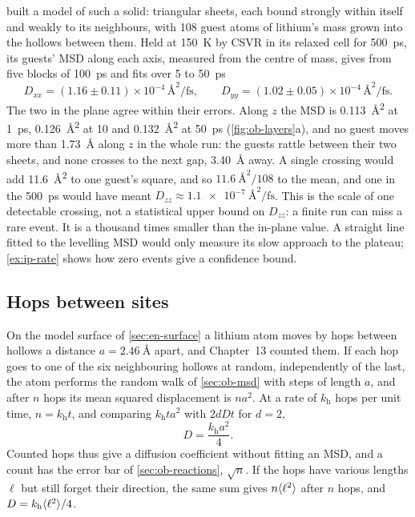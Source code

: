  built a model of such a solid: triangular sheets, each
bound strongly within itself and weakly to its neighbours, with 108 guest
atoms of lithium's mass grown into the hollows between them. Held at
\SI{150}{\kelvin} by CSVR in its relaxed cell for \SI{500}{\pico\second},
its guests' MSD along each axis, measured from the centre of mass, gives
from five blocks of \SI{100}{\pico\second} and fits over 5 to
\SI{50}{\pico\second}
\begin{equation*}
   D_{xx} = (1.16 \pm 0.11)\times10^{-4}\,\si{\angstrom\squared\per
   \femto\second} , \qquad
   D_{yy} = (1.02 \pm 0.05)\times10^{-4}\,\si{\angstrom\squared\per
   \femto\second} .
\end{equation*}
The two in the plane agree within their errors. Along $z$ the MSD is
\SI{0.113}{\angstrom\squared} at \SI{1}{\pico\second},
\SI{0.126}{\angstrom\squared} at 10 and \SI{0.132}{\angstrom\squared} at
\SI{50}{\pico\second} (\cref{fig:ob-layers}a), and no guest moves more
than \SI{1.73}{\angstrom} along $z$ in the whole run: the guests rattle
between their two sheets, and none crosses to the next gap,
\SI{3.40}{\angstrom} away. A single crossing would add
\SI{11.6}{\angstrom\squared} to one guest's square, and so
$\SI{11.6}{\angstrom\squared}/108$ to the mean, and one in the
\SI{500}{\pico\second} would have meant $D_{zz} \approx
\SI{1.1e-7}{\angstrom\squared\per\femto\second}$. This is the scale of one detectable crossing, not a statistical upper
bound on $D_{zz}$: a finite run can miss a rare event. It is a thousand
times smaller than the in-plane value. A straight line fitted to the
levelling MSD would only measure its slow approach to the plateau;
\cref{ex:ip-rate} shows how zero events give a confidence bound.

\subsection*{Hops between sites}

On the model surface of \cref{sec:en-surface} a lithium atom moves by
hops between hollows a distance $a = \SI{2.46}{\angstrom}$ apart, and
Chapter~13 counted them. If each hop goes to one of the six neighbouring
hollows at random, independently of the last, the atom performs the
random walk of \cref{sec:ob-msd} with steps of length $a$, and after $n$
hops its mean squared displacement is $na^2$. At a rate of $k_{\mathrm h}$ hops
per unit time, $n = k_{\mathrm h}t$, and comparing $k_{\mathrm h}ta^2$ with $2dDt$ for
$d = 2$,
\begin{equation*}
   D = \frac{k_{\mathrm h}a^2}{4} .
\end{equation*}
Counted hops thus give a diffusion coefficient without fitting an MSD,
and a count has the error bar of \cref{sec:ob-reactions}, $\sqrt n$. If
the hops have various lengths $\ell$ but still forget their direction,
the same sum gives $n\langle \ell^2 \rangle$ after $n$ hops, and $D = k_{\mathrm
h}\langle \ell^2 \rangle/4$.

